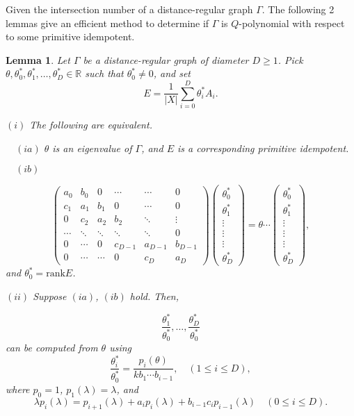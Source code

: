 \documentclass[
]{book}
\newtheorem{lemma}{Lemma}[chapter]
\theoremstyle{definition}
\theoremstyle{definition}
\theoremstyle{definition}
\theoremstyle{definition}
\theoremstyle{remark}
\begin{document}
Given the intersection number of a distance-regular graph \(\Gamma\). The following 2 lemmas give an efficient method to determine if \(\Gamma\) is \(Q\)-polynomial with respect to some primitive idempotent.

\begin{lemma}
\protect\hypertarget{lem:dual-eigenvalues}{}\label{lem:dual-eigenvalues}Let \(\Gamma\) be a distance-regular graph of diameter \(D\geq 1\).
Pick \(\theta, \theta^*_0, \theta^*_1, \ldots, \theta^*_D\in \mathbb{R}\) such that \(\theta^*_0 \neq 0\), and set
\[E = \frac{1}{|X|}\sum_{i=0}^D\theta^*_iA_i.\]

\((i)\) The following are equivalent.

\(\quad (ia)\) \(\theta\) is an eigenvalue of \(\Gamma\), and \(E\) is a corresponding primitive idempotent.

\(\quad (ib)\)

\[\begin{pmatrix} a_0 & b_0 & 0 & \cdots & \cdots & 0\\
c_1 & a_1 & b_1 & 0 & \cdots & 0\\
0 & c_2 & a_2 & b_2 & \ddots & \vdots\\
\cdots & \ddots & \ddots & \ddots & \ddots & 0 \\
0 & \cdots & 0 & c_{D-1} & a_{D-1} & b_{D-1}\\
0 & \cdots & \cdots & 0 & c_D & a_D 
\end{pmatrix} \begin{pmatrix} \theta^*_0\\\theta^*_1\\\vdots \\\vdots \\\vdots\\ \theta^*_D\end{pmatrix} = \theta\cdots \begin{pmatrix} \theta^*_0\\\theta^*_1\\\vdots\\\vdots\\ \vdots \\ \theta^*_D\end{pmatrix},
\]
and \(\theta^*_0 = \mathrm{rank}E\).

\((ii)\) Suppose \((ia)\), \((ib)\) hold. Then,

\[\frac{\theta^*_1}{\theta^*_0}, \ldots, \frac{\theta^*_D}{\theta^*_0}\]
can be computed from \(\theta\) using
\[\frac{\theta^*_i}{\theta^*_0} = \frac{p_i(\theta)}{kb_1\cdots b_{i-1}}, \quad (1\leq i\leq D),\]
where \(p_0 = 1\), \(p_1(\lambda) = \lambda\), and
\[\lambda p_i(\lambda) = p_{i+1}(\lambda) + a_ip_i(\lambda) + b_{i-1}c_ip_{i-1}(\lambda)\quad (0\leq i\leq D).\]
\end{lemma}
\end{document}
